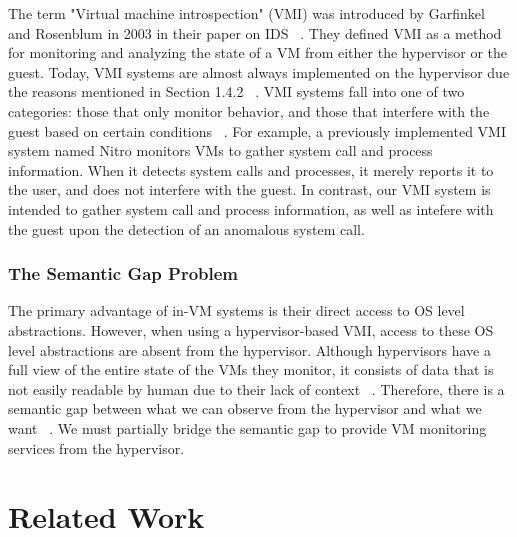 \documentclass{report}
\begin{document}
\begin{spacing}{1.5}
{\large
The term "Virtual machine introspection" (VMI) was introduced by Garfinkel and Rosenblum in 2003 in their paper on IDS ~\cite{garfinkel2003virtual}. They defined VMI as a method for monitoring and analyzing the state of a VM from either the hypervisor or the guest. Today, VMI systems are almost always implemented on the hypervisor due the reasons mentioned in Section 1.4.2 ~\cite{bhatt2018using}. VMI systems fall into one of two categories: those that only monitor behavior, and those that interfere with the guest based on certain conditions ~\cite{nance2008virtual}. For example, a previously implemented VMI system named Nitro monitors VMs to gather system call and process information. When it detects system calls and processes, it merely reports it to the user, and does not interfere with the guest. In contrast, our VMI system is intended to gather system call and process information, as well as intefere with the guest upon the detection of an anomalous system call.
\newline
}


\subsection{The Semantic Gap Problem}

{\large
The primary advantage of in-VM systems is their direct access to OS level abstractions. However, when using a hypervisor-based VMI, access to these OS level abstractions are absent from the hypervisor. Although hypervisors have a full view of the entire state of the VMs they monitor, it consists of data that is not easily readable by human due to their lack of context ~\cite{bauman2015survey}. Therefore, there is a semantic gap between what we can observe from the hypervisor and what we want ~\cite{bauman2015survey}. We must partially bridge the semantic gap to provide VM monitoring services from the hypervisor.
\newline
}


















\chapter{Related Work}


\end{spacing}
\end{document}
